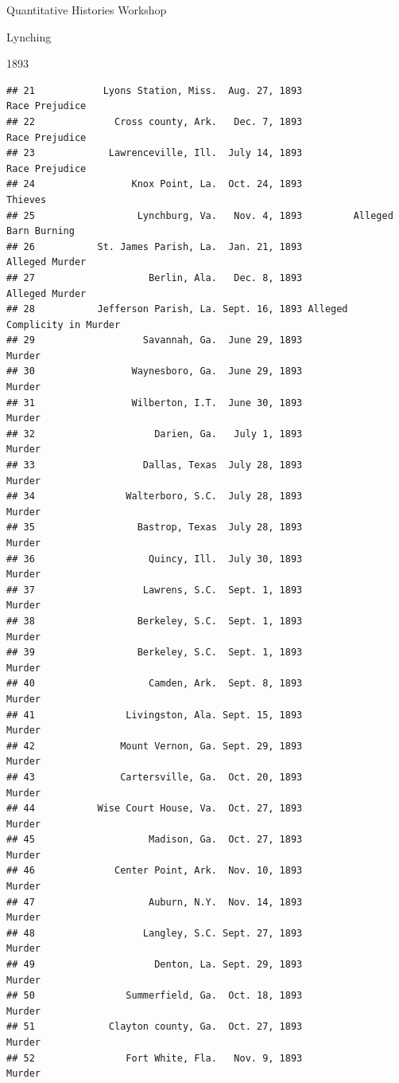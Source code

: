 \documentclass[
  ignorenonframetext,
]{beamer}
\begin{document}
\begin{frame}[fragile]{Quantitative Histories Workshop}
\begin{block}{Lynching}
\begin{block}{1893}
\begin{verbatim}
## 21            Lyons Station, Miss.  Aug. 27, 1893               Race Prejudice
## 22              Cross county, Ark.   Dec. 7, 1893               Race Prejudice
## 23             Lawrenceville, Ill.  July 14, 1893               Race Prejudice
## 24                 Knox Point, La.  Oct. 24, 1893                      Thieves
## 25                  Lynchburg, Va.   Nov. 4, 1893         Alleged Barn Burning
## 26           St. James Parish, La.  Jan. 21, 1893               Alleged Murder
## 27                    Berlin, Ala.   Dec. 8, 1893               Alleged Murder
## 28           Jefferson Parish, La. Sept. 16, 1893 Alleged Complicity in Murder
## 29                   Savannah, Ga.  June 29, 1893                       Murder
## 30                 Waynesboro, Ga.  June 29, 1893                       Murder
## 31                 Wilberton, I.T.  June 30, 1893                       Murder
## 32                     Darien, Ga.   July 1, 1893                       Murder
## 33                   Dallas, Texas  July 28, 1893                       Murder
## 34                Walterboro, S.C.  July 28, 1893                       Murder
## 35                  Bastrop, Texas  July 28, 1893                       Murder
## 36                    Quincy, Ill.  July 30, 1893                       Murder
## 37                   Lawrens, S.C.  Sept. 1, 1893                       Murder
## 38                  Berkeley, S.C.  Sept. 1, 1893                       Murder
## 39                  Berkeley, S.C.  Sept. 1, 1893                       Murder
## 40                    Camden, Ark.  Sept. 8, 1893                       Murder
## 41                Livingston, Ala. Sept. 15, 1893                       Murder
## 42               Mount Vernon, Ga. Sept. 29, 1893                       Murder
## 43               Cartersville, Ga.  Oct. 20, 1893                       Murder
## 44           Wise Court House, Va.  Oct. 27, 1893                       Murder
## 45                    Madison, Ga.  Oct. 27, 1893                       Murder
## 46              Center Point, Ark.  Nov. 10, 1893                       Murder
## 47                    Auburn, N.Y.  Nov. 14, 1893                       Murder
## 48                   Langley, S.C. Sept. 27, 1893                       Murder
## 49                     Denton, La. Sept. 29, 1893                       Murder
## 50                Summerfield, Ga.  Oct. 18, 1893                       Murder
## 51             Clayton county, Ga.  Oct. 27, 1893                       Murder
## 52                Fort White, Fla.   Nov. 9, 1893                       Murder

\end{verbatim}
\end{block}
\end{block}
\end{frame}
\end{document}
